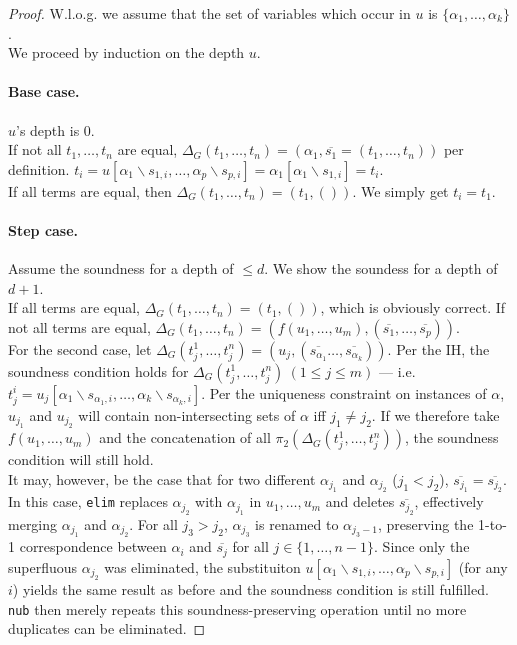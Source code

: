 \documentclass[a4paper, 11pt]{report}
\begin{document}
\begin{proof}
W.l.o.g. we assume that the set of variables which occur in $u$ is $\{\alpha_1,\dots,\alpha_k\}$.\\
We proceed by induction on the depth $u$.

\paragraph{Base case.} $u$'s depth is 0.\\
If not all $t_1,\dots,t_n$ are equal, $\Delta_G(t_1,\dots,t_n) = (\alpha_1,\overline{s_1} = (t_1,\dots,t_n))$ per definition.
$t_i = u[\alpha_1\backslash s_{1,i},\dots,\alpha_p\backslash s_{p,i}] = \alpha_1[\alpha_1\backslash s_{1,i}] = t_i$.\\
If all terms are equal, then $\Delta_G(t_1,\dots,t_n) = (t_1,())$. We simply get $t_i = t_1$.

\paragraph{Step case.} Assume the soundness for a depth of $\leq d$. We show the soundess for a depth of $d+1$.\\

\noindent
If all terms are equal, $\Delta_G(t_1,\dots,t_n) = (t_1,())$, which is obviously correct.
If not all terms are equal, $\Delta_G(t_1,\dots,t_n) = (f(u_1,\dots,u_m), (\overline{s_1},\dots,\overline{s_p}))$.\\

\noindent
For the second case, let $\Delta_G(t_j^1,\dots,t_j^n) = (u_j,(\overline{s_{\alpha_1}}\dots,\overline{s_{\alpha_k}}))$. Per the IH, the soundness condition holds for $\Delta_G(t_j^1,\dots,t_j^n)\ (1\leq j\leq m)$ --- i.e. $t_j^i = u_j[\alpha_1\backslash s_{\alpha_1,i},\dots,\alpha_k\backslash s_{\alpha_k,i}]$. Per the uniqueness constraint on instances of $\alpha$, $u_{j_1}$ and $u_{j_2}$ will contain non-intersecting sets of $\alpha$ iff $j_1 \neq j_2$. If we therefore take $f(u_1,\dots,u_m)$ and the concatenation of all $\pi_2(\Delta_G(t_j^1,\dots,t_j^n))$, the soundness condition will still hold.\\

It may, however, be the case that for two different $\alpha_{j_1}$ and $\alpha_{j_2}$ ($j_1 < j_2$), $\overline{s_{j_1}} = \overline{s_{j_2}}$. In this case, \texttt{elim} replaces $\alpha_{j_2}$ with $\alpha_{j_1}$ in $u_1,\dots,u_m$ and deletes $\overline{s_{j_2}}$, effectively merging $\alpha_{j_1}$ and $\alpha_{j_2}$. For all $j_3 > j_2$, $\alpha_{j_3}$ is renamed to $\alpha_{j_3 - 1}$, preserving the 1-to-1 correspondence between $\alpha_i$ and $\overline{s_j}$ for all $j \in \{1,\dots,n-1\}$. Since only the superfluous $\alpha_{j_2}$ was eliminated, the substituiton $u[\alpha_1\backslash s_{1,i},\dots,\alpha_p\backslash s_{p,i}]$ (for any $i$) yields the same result as before and the soundness condition is still fulfilled.\\

\texttt{nub} then merely repeats this soundness-preserving operation until no more duplicates can be eliminated.

\end{proof}
\end{document}
